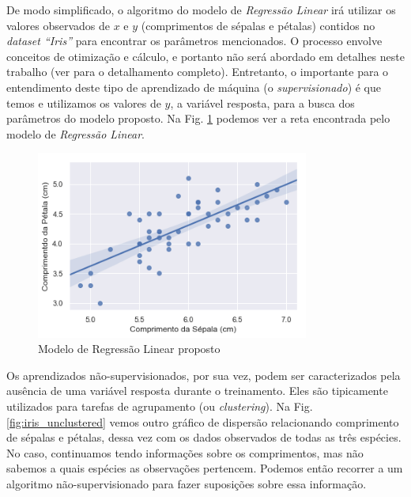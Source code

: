 De modo simplificado, o algoritmo do modelo de \textit{Regressão Linear} irá utilizar os valores observados de $x$ e $y$ (comprimentos de sépalas e pétalas) contidos no \textit{dataset “Iris”} para encontrar os parâmetros mencionados. O processo envolve conceitos de otimização e cálculo, e portanto não será abordado em detalhes neste trabalho (ver \cite{2004:bussab} para o detalhamento completo). Entretanto, o importante para o entendimento deste tipo de aprendizado de máquina (o \textit{supervisionado}) é que temos e utilizamos os valores de $y$, a variável resposta, para a busca dos parâmetros do modelo proposto. Na Fig. \ref{fig:rl} podemos ver a reta encontrada pelo modelo de \textit{Regressão Linear}.


\begin{figure}[H]
    \centering
    \includegraphics[width=0.8\textwidth]{img/reg_iris.png}
    \caption{Modelo de Regressão Linear proposto}
    \label{fig:rl}
\end{figure}

Os aprendizados não-supervisionados, por sua vez, podem ser caracterizados pela ausência de uma variável resposta durante o treinamento. Eles são tipicamente utilizados para tarefas de agrupamento (ou \textit{clustering}). Na Fig. \ref{fig:iris_unclustered} vemos outro gráfico de dispersão relacionando comprimento de sépalas e pétalas, dessa vez com os dados observados de todas as três espécies. No caso, continuamos tendo informações sobre os comprimentos, mas não sabemos a quais espécies as observações pertencem. Podemos então recorrer a um algoritmo não-supervisionado para fazer suposições sobre essa informação.

